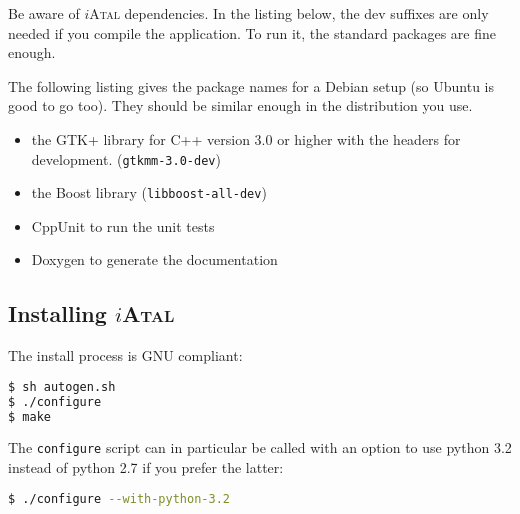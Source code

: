 \documentclass[a4paper,11pt]{article}
\newcommand\iAtal{$i$\textsc{Atal}}
\begin{document}
Be aware of \iAtal{} dependencies. In the listing below, the dev
suffixes are only needed if you compile the application. To run it,
the standard packages are fine enough.

The following listing gives the package names for a Debian setup (so
Ubuntu is good to go too). They should be similar enough in the
distribution you use.

\begin{itemize}
\item the GTK+ library for C++ version 3.0 or higher with the headers
  for development. (\texttt{gtkmm-3.0-dev})
\item the Boost library (\texttt{libboost-all-dev})
\item CppUnit to run the unit tests
\item Doxygen to generate the documentation
\end{itemize}

\subsection{Installing \iAtal{}}
The install process is GNU compliant:
\begin{lstlisting}[language=sh]
$ sh autogen.sh
$ ./configure
$ make
\end{lstlisting}

The \texttt{configure} script can in particular be called with an
option to use python 3.2 instead of python 2.7 if you prefer the latter:

\begin{lstlisting}[language=sh]
$ ./configure --with-python-3.2
\end{lstlisting}
\end{document}
